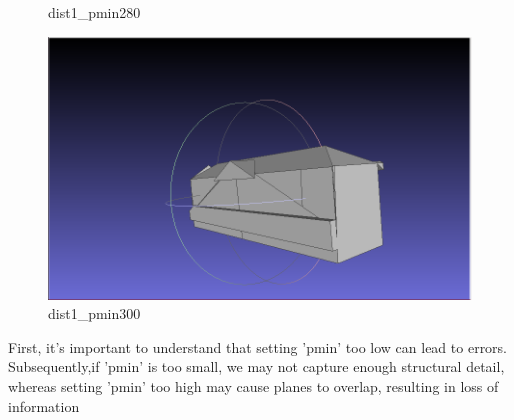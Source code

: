 \documentclass{article}
\begin{document}
\begin{figure}[H]
\begin{minipage}[b]{0.45\textwidth}
      \caption{dist1\_pmin280}
      \label{fig:dist1_pmin280}
    \end{minipage}
    \hfill
    \begin{minipage}[b]{0.45\textwidth}

        \includegraphics[width=\textwidth]{../../images/screen_kinetic/dist1_pmin300.png}
        \caption{dist1\_pmin300}
        \label{fig:dist1_pmin300}
      \end{minipage}
  \end{figure}
  
  First, it's important to understand that setting 'pmin' too low can lead to errors. Subsequently,if 'pmin' is too small, we may not capture enough structural detail,
  whereas setting 'pmin' too high may cause planes to overlap, resulting in loss of information
\end{document}
